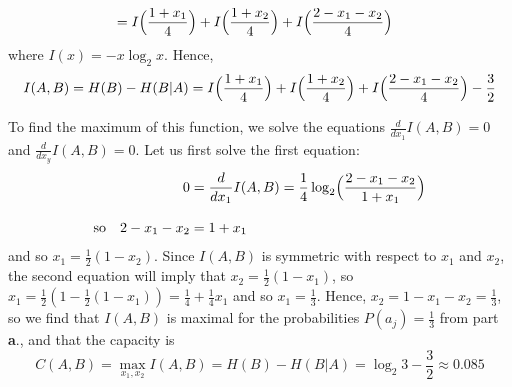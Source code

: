 \documentclass[11pt]{article}
\newcommand{\ds}{\displaystyle}
\begin{document}
\begin{itemize}
\begin{align*}
             &= I\Bigl(\frac{1+x_1}{4}\Bigr) + I\Bigl(\frac{1+x_2}{4}\Bigr) + I\Bigl(\frac{2-x_1-x_2}{4}\Bigr)
   \end{align*}
  where $I(x) = -x\log_2 x$.
  Hence,
  \[
    I(A,B) = H(B) - H(B|A) = I\Bigl(\frac{1+x_1}{4}\Bigr) + I\Bigl(\frac{1+x_2}{4}\Bigr) + I\Bigl(\frac{2-x_1-x_2}{4}\Bigr) - \frac{3}{2}
  \]
\end{itemize}
To find the maximum of this function,
we solve the equations $\ds\frac{d}{dx_1}I(A,B) = 0$ and $\ds\frac{d}{dx_y}I(A,B) = 0$.
Let us first solve the first equation:
\begin{align*}
  0 &= \frac{d}{dx_1}I(A,B)
     = \frac{1}{4}\log_2\Bigl(\frac{2-x_1-x_2}{1+x_1}\Bigr)\\[3mm]
  \text{so}\quad
  2 - x_1 - x_2
    &= 1 + x_1
\end{align*}
and so $x_1 =\frac{1}{2}(1-x_2)$.
Since $I(A,B)$ is symmetric with respect to $x_1$ and $x_2$,
the second equation will imply that $x_2 = \frac{1}{2}(1-x_1)$,
so $x_1 = \frac{1}{2}(1-\frac{1}{2}(1-x_1)) = \frac{1}{4} + \frac{1}{4}x_1$ and so $x_1 = \frac{1}{3}$.
Hence, $x_2 = 1-x_1-x_2 = \frac{1}{3}$,
so we find that $I(A,B)$ is maximal for the probabilities $P(a_j) = \frac{1}{3}$ from part {\bf a}.,
and that the capacity is
\[
  C(A,B) = \max_{x_1,x_2} I(A,B) = H(B) - H(B|A) = \log_2 3 - \frac{3}{2} \approx 0.085
\]
\end{document}
